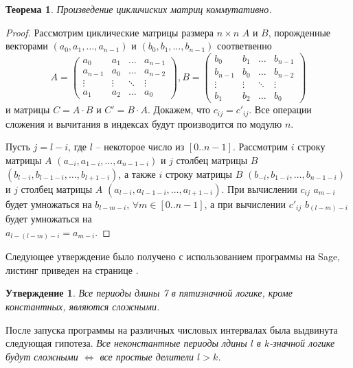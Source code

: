 \documentclass[bibliography=totoc, a4paper, 14pt]{extarticle}
\newtheorem{myth}{Теорема}
\newtheorem*{myst}{Утверждение}
\begin{document}
\begin{myth}
Произведение цикличиских матриц коммутативно.
\end{myth}
\begin{proof}
Рассмотрим циклические матрицы размера $n \times n$ $A$ и $B$, порожденные векторами $(a_0,a_1,\ldots,a_{n-1})$ и
$(b_0,b_1,\ldots,b_{n-1})$ соответвенно
$$
A = \begin{pmatrix}
a_0     & a_1    & \ldots & a_{n-1} \\
a_{n-1} & a_0    & \ldots & a_{n-2} \\
\vdots  & \vdots & \ddots & \vdots \\
a_1     & a_2    & \ldots & a_0
\end{pmatrix}
,
B = \begin{pmatrix}
b_0     & b_1    & \ldots & b_{n-1} \\
b_{n-1} & b_0    & \ldots & b_{n-2} \\
\vdots  & \vdots & \ddots & \vdots \\
b_1     & b_2    & \ldots & b_0
\end{pmatrix}
$$
и матрицы $C = A \cdot B$ и $C' = B \cdot A$.
Докажем, что $c_{ij} = c'_{ij}$. Все операции сложения и вычитания в индексах будут производится по модулю $n$.

Пусть $j = l - i$, где $l$ -- некоторое число из $[0..n-1]$. Рассмотрим $i$ строку матрицы
$A$ $(a_{-i},a_{1-i},\ldots,a_{n-1-i})$ и $j$ столбец матрицы $B$ $(b_{l-i},b_{l-1-i},
\ldots,b_{l+1-i})$, а также $i$ строку матрицы $B$ $(b_{-i},b_{1-i},\ldots,b_{n-1-i})$ и $j$
столбец матрицы $A$ $(a_{l-i},a_{l-1-i},\ldots,a_{l+1-i})$. При вычислении $c_{ij}$ $a_{m-i}$
будет умножаться на $b_{l-m-i}$, $\forall m \in [0..n-1]$, а при вычислении $c'_{ij}$ $b_{(l-m)-i}$
будет умножаться на \\ $a_{l-(l-m)-i} = a_{m-i}$.
\end{proof}

Следующее утверждение было получено с использованием программы на {S}age,
листинг приведен на странице \pageref{sub:sage}.

\begin{myst}
Все периоды длины 7 в пятизначной логике, кроме константных, являются сложными.
\end{myst}

После запуска программы на различных числовых интервалах была выдвинута следующая гипотеза.
\emph{Все неконстантные периоды лдины $l$ в $k$\nobreakdash-значной логике будут сложными $\Leftrightarrow$
все простые делители $l > k$.}
\end{document}
